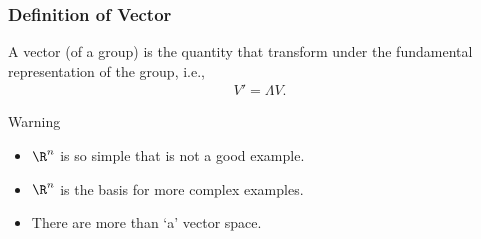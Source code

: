 \begin{frame}
  \frametitle{Definition of Vector}
  \begin{definition}
    A \alert{vector} (of a group) is the quantity that transform under the fundamental representation of the group, i.e.,
    \begin{align*}
      V' = \Lambda V.
    \end{align*}
  \end{definition}
  \begin{alertblock}{Warning}
    \begin{itemize}
    \item $\R^n$ is so simple that is not a good example.
    \item $\R^n$ is the basis for more complex examples.
    \item There are more than `a' vector space.
    \end{itemize}
  \end{alertblock}
\end{frame}


